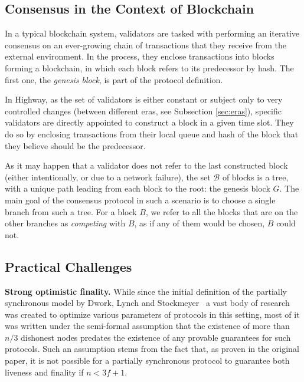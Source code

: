 \documentclass[12pt, fleqn]{article}
\begin{document}
\subsection{Consensus in the Context of Blockchain}

In a typical blockchain system, validators are tasked with performing an iterative consensus on an ever-growing chain of transactions that they receive from the external environment. 
In the process, they enclose transactions into blocks forming a blockchain, in which each block refers to its predecessor by hash.
The first one, the \emph{genesis block}, is part of the protocol definition. 

In Highway, as the set of validators is either constant or subject only to very controlled changes (between different eras, see Subsection \ref{sec:eras}), specific validators are directly appointed to construct a block in a given time slot.
They do so by enclosing transactions from their local queue and hash of the block that they believe should be the predecessor.

As it may happen that a validator does not refer to the last constructed block (either intentionally, or due to a network failure), the set $\mathcal{B}$ of blocks is a tree, with a unique path leading from each block to the root: the genesis block $G$. 
The main goal of the consensus protocol in such a scenario is to choose a single branch from such a tree.
For a block $B$, we refer to all the blocks that are on the other branches as \emph{competing} with $B$, as if any of them would be chosen, $B$ could not.


\subsection{Practical Challenges}

{\bf Strong optimistic finality.} While since the initial definition of the partially synchronous model by Dwork, Lynch and Stockmeyer~\cite{DLS88} a vast body of research was created to optimize various parameters of protocols in this setting, most of it was written under the semi-formal assumption that the existence of more than $n/3$ dishonest nodes predates the existence of any provable guarantees for such protocols.
Such an assumption stems from the fact that, as proven in the original paper, it is not possible for a partially synchronous protocol to guarantee both liveness and finality if $n<3f+1$.
\end{document}
